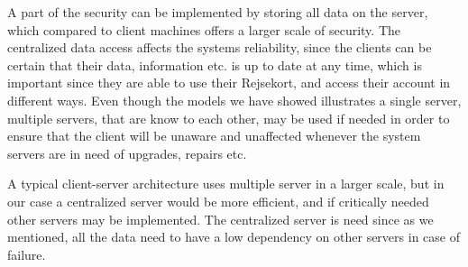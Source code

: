 A part of the security can be implemented by storing all data on the server, which compared to client machines offers a larger scale of security.
The centralized data access affects the systems reliability, since the clients can be certain that their data, information  etc. is up to date at any time, which is important since they are able to use their Rejsekort, and access their account in different ways. Even though the models we have showed illustrates a single server, multiple servers, that are know to each other, may be used if needed in order to ensure that the client will be unaware and unaffected whenever the system servers are in need of upgrades, repairs etc.



A typical client-server architecture uses multiple server in a larger scale, but in our case a centralized server would be more efficient, and if critically needed other servers may be implemented. The centralized server is need since as we mentioned, all the data need to have a low dependency on other servers in case of failure.